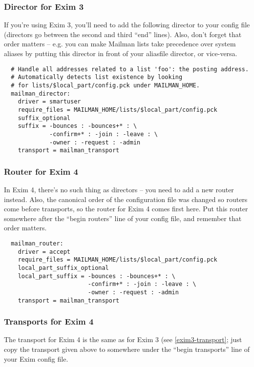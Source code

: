 \documentclass{howto}
\begin{document}
\subsubsection{Director for Exim 3}

If you're using Exim 3, you'll need to add the following director to your
config file (directors go between the second and third ``end'' lines).  Also,
don't forget that order matters -- e.g. you can make Mailman lists take
precedence over system aliases by putting this director in front of your
aliasfile director, or vice-versa.

\begin{verbatim}
  # Handle all addresses related to a list 'foo': the posting address.
  # Automatically detects list existence by looking
  # for lists/$local_part/config.pck under MAILMAN_HOME.
  mailman_director:
    driver = smartuser
    require_files = MAILMAN_HOME/lists/$local_part/config.pck
    suffix_optional
    suffix = -bounces : -bounces+* : \
             -confirm+* : -join : -leave : \
             -owner : -request : -admin
    transport = mailman_transport
\end{verbatim}

\subsubsection{Router for Exim 4}

In Exim 4, there's no such thing as directors -- you need to add a new router
instead.  Also, the canonical order of the configuration file was changed so
routers come before transports, so the router for Exim 4 comes first here.
Put this router somewhere after the ``begin routers'' line of your config
file, and remember that order matters.

\begin{verbatim}
  mailman_router:
    driver = accept
    require_files = MAILMAN_HOME/lists/$local_part/config.pck
    local_part_suffix_optional
    local_part_suffix = -bounces : -bounces+* : \
                        -confirm+* : -join : -leave : \
                        -owner : -request : -admin
    transport = mailman_transport
\end{verbatim}

\subsubsection{Transports for Exim 4}

The transport for Exim 4 is the same as for Exim 3 (see \ref{exim3-transport};
just copy the transport given above to somewhere under the ``begin
transports'' line of your Exim config file.
\end{document}
